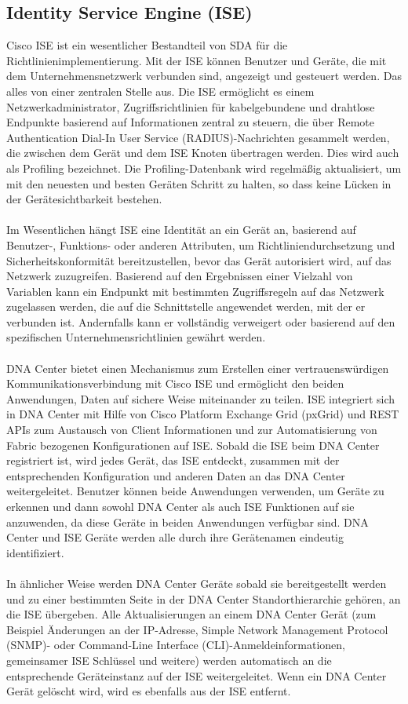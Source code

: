 \subsection{Identity Service Engine (ISE)}
Cisco ISE ist ein wesentlicher Bestandteil von SDA für die Richtlinienimplementierung. Mit der ISE können Benutzer und Geräte, die mit dem Unternehmensnetzwerk verbunden sind, angezeigt und gesteuert werden. Das alles von einer zentralen Stelle aus. Die ISE ermöglicht es einem Netzwerkadministrator, Zugriffsrichtlinien für kabelgebundene und drahtlose Endpunkte basierend auf Informationen zentral zu steuern, die über Remote Authentication Dial-In User Service (RADIUS)-Nachrichten gesammelt werden, die zwischen dem Gerät und dem ISE Knoten übertragen werden. Dies wird auch als Profiling bezeichnet. Die Profiling-Datenbank wird regelmäßig aktualisiert, um mit den neuesten und besten Geräten Schritt zu halten, so dass keine Lücken in der Gerätesichtbarkeit bestehen. \\
\\
Im Wesentlichen hängt ISE eine Identität an ein Gerät an, basierend auf Benutzer-, Funktions- oder anderen Attributen, um Richtliniendurchsetzung und Sicherheitskonformität bereitzustellen, bevor das Gerät autorisiert wird, auf das Netzwerk zuzugreifen. Basierend auf den Ergebnissen einer Vielzahl von Variablen kann ein Endpunkt mit bestimmten Zugriffsregeln auf das Netzwerk zugelassen werden, die auf die Schnittstelle angewendet werden, mit der er verbunden ist. Andernfalls kann er vollständig verweigert oder basierend auf den spezifischen Unternehmensrichtlinien gewährt werden. \\
\\
DNA Center bietet einen Mechanismus zum Erstellen einer vertrauenswürdigen Kommunikationsverbindung mit Cisco ISE und ermöglicht den beiden Anwendungen, Daten auf sichere Weise miteinander zu teilen. ISE integriert sich in DNA Center mit Hilfe von Cisco Platform Exchange Grid (pxGrid) und REST APIs zum Austausch von Client Informationen und zur Automatisierung von Fabric bezogenen Konfigurationen auf ISE. Sobald die ISE beim DNA Center registriert ist, wird jedes Gerät, das ISE entdeckt, zusammen mit der entsprechenden Konfiguration und anderen Daten an das DNA Center weitergeleitet. Benutzer können beide Anwendungen verwenden, um Geräte zu erkennen und dann sowohl DNA Center als auch ISE Funktionen auf sie anzuwenden, da diese Geräte in beiden Anwendungen verfügbar sind. DNA Center und ISE Geräte werden alle durch ihre Gerätenamen eindeutig identifiziert. \\
\\
In ähnlicher Weise werden DNA Center Geräte sobald sie bereitgestellt werden und zu einer bestimmten Seite in der DNA Center Standorthierarchie gehören, an die ISE übergeben. Alle Aktualisierungen an einem DNA Center Gerät (zum Beispiel Änderungen an der IP-Adresse, Simple Network Management Protocol (SNMP)- oder Command-Line Interface (CLI)-Anmeldeinformationen, gemeinsamer ISE Schlüssel und weitere) werden automatisch an die entsprechende Geräteinstanz auf der ISE weitergeleitet. Wenn ein DNA Center Gerät gelöscht wird, wird es ebenfalls aus der ISE entfernt. \cite{sda-designguide}

